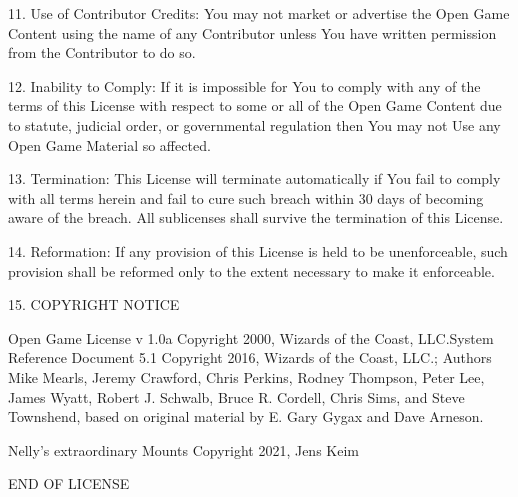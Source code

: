 \documentclass[letterpaper,twocolumn,openany,nodeprecatedcode]{dndbook}
\begin{document}
11. Use of Contributor Credits: You may not market or advertise the Open Game Content using the name of any Contributor unless You have written permission from the Contributor to do so.

12. Inability to Comply: If it is impossible for You to comply with any of the terms of this License with respect to some or all of the Open Game Content due to statute, judicial order, or governmental regulation then You may not Use any Open Game Material so affected.

13. Termination: This License will terminate automatically if You fail to comply with all terms herein and fail to cure such breach within 30 days of becoming aware of the breach. All sublicenses shall survive the termination of this License.

14. Reformation: If any provision of this License is held to be unenforceable, such provision shall be reformed only to the extent necessary to make it enforceable.

15. COPYRIGHT NOTICE

    Open Game License v 1.0a Copyright 2000, Wizards of the Coast, LLC.System Reference Document 5.1 Copyright 2016, Wizards of the Coast, LLC.; Authors Mike Mearls, Jeremy Crawford, Chris Perkins, Rodney Thompson, Peter Lee, James Wyatt, Robert J. Schwalb, Bruce R. Cordell, Chris Sims, and Steve Townshend, based on original material by E. Gary Gygax and Dave Arneson.

    Nelly's extraordinary Mounts Copyright 2021, Jens Keim

END OF LICENSE
\end{document}
